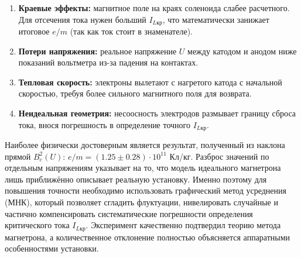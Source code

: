 \documentclass[a4paper,12pt]{article}
\begin{document}
\begin{enumerate}
    \item \textbf{Краевые эффекты:} магнитное поле на краях соленоида слабее расчетного. Для отсечения тока нужен больший $I_{L\text{кр}}$, что математически занижает итоговое $e/m$ (так как ток стоит в знаменателе).
    \item \textbf{Потери напряжения:} реальное напряжение $U$ между катодом и анодом ниже показаний вольтметра из-за падения на контактах.
    \item \textbf{Тепловая скорость:} электроны вылетают с нагретого катода с начальной скоростью, требуя более сильного магнитного поля для возврата.
    \item \textbf{Неидеальная геометрия:} несоосность электродов размывает границу сброса тока, внося погрешность в определение точного $I_{L\text{кр}}$.
\end{enumerate}

\hspace{15pt} Наиболее физически достоверным является результат, полученный из наклона прямой $B_c^2(U)$: $e/m = (1.25 \pm 0.28) \cdot 10^{11}$ Кл/кг. Разброс значений по отдельным напряжениям указывает на то, что модель идеального магнетрона лишь приближённо описывает реальную установку. Именно поэтому для повышения точности необходимо использовать графический метод усреднения (МНК), который позволяет сгладить флуктуации, нивелировать случайные и частично компенсировать систематические погрешности определения критического тока $I_{L\text{кр}}$. Эксперимент качественно подтвердил теорию метода магнетрона, а количественное отклонение полностью объясняется аппаратными особенностями установки.
\end{document}
